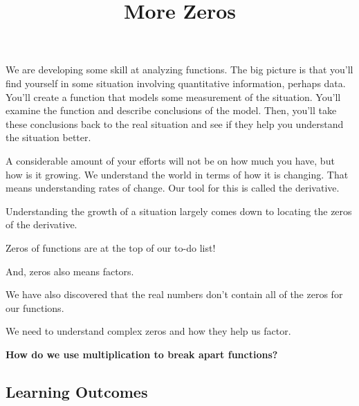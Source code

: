 \documentclass{ximera}
\title{More Zeros}
\begin{document}
\begin{abstract}
%
\end{abstract}
\maketitle




We are developing some skill at analyzing functions.  The big picture is that you'll find yourself in some situation involving quantitative information, perhaps data.  You'll create a function that models some measurement of the situation.  You'll examine the function and describe conclusions of the model.  Then, you'll take these conclusions back to the real situation and see if they help you understand the situation better.




A considerable amount of your efforts will not be on how much you have, but how is it growing.  We understand the world in terms of how it is changing.  That means understanding rates of change.  Our tool for this is called the derivative.




Understanding the growth of a situation largely comes down to locating the zeros of the derivative.


Zeros of functions are at the top of our to-do list!  

And, zeros also means factors.  


We have also discovered that the real numbers don't contain all of the zeros for our functions.  


We need to understand complex zeros and how they help us factor.  


\begin{center}
\textbf{\textcolor{red!70!black}{How do we use multiplication to break apart functions?}}
\end{center} 





















\subsection*{Learning Outcomes}
\end{document}

